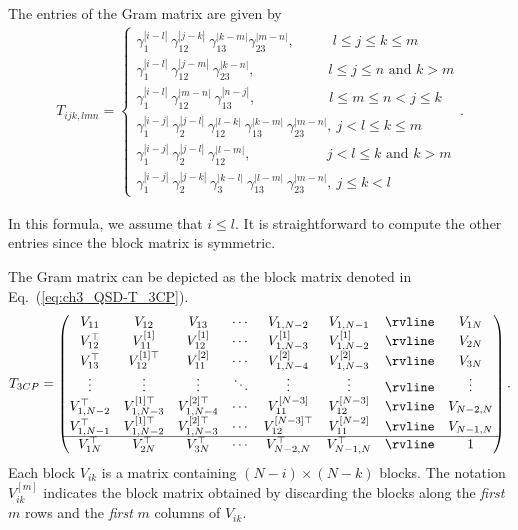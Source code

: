 \begin{appendices}
The entries of the Gram matrix are given by
\begin{align}
    T_{ijk,lmn} =
    \begin{cases}
        \gamma_1^{|i-l|}\ \gamma_{12}^{|j-k|}\ \gamma_{13}^{|k-m|} \gamma_{23}^{|m-n|},\ \hspace{30pt} l \le j \le k \le m \\
        \gamma_1^{|i-l|}\ \gamma_{12}^{|j-m|}\ \gamma_{23}^{|k-n|},\ \hspace{60pt} l \le j \le n \text{ and } k > m \\
        \gamma_1^{|i-l|}\ \gamma_{12}^{|m-n|}\ \gamma_{13}^{|n-j|},\ \hspace{60pt} l \le m \le n < j \le k \\
        \gamma_1^{|i-j|}\ \gamma_2^{|j-l|}\ \gamma_{12}^{|l-k|}\ \gamma_{13}^{|k-m|}\ \gamma_{23}^{|m-n|},\ j < l \le k \le m \\
        \gamma_1^{|i-j|}\ \gamma_2^{|j-l|}\ \gamma_{12}^{|l-m|},\ \hspace{62pt} j < l \le k \text{ and } k > m \\
        \gamma_1^{|i-j|}\ \gamma_2^{|j-k|}\ \gamma_3^{|k-l|}\ \gamma_{13}^{|l-m|}\ \gamma_{23}^{|m-n|},\ j \le k < l
    \end{cases}. 
\end{align}

In this formula, we assume that $i \le l$.
It is straightforward to compute the other entries since the block matrix is symmetric.

The Gram matrix can be depicted as the block matrix denoted in Eq.~(\ref{eq:ch3_QSD-T_3CP}).
\begin{align}
    \label{eq:ch3_QSD-T_3CP}
    T_{3CP} =
    \begin{pmatrix}
        V_{11} & V_{12} & V_{13} & \cdots & V_{1,N-2} & V_{1,N-1} & \rvline & V_{1N} \\
        V_{12}^\top & V_{11}^{[1]} & V_{12}^{[1]} & \cdots & V_{1,N-3}^{[1]} & V_{1,N-2}^{[1]} & \rvline & V_{2N} \\
        V_{13}^\top & V_{12}^{[1]\top} & V_{11}^{[2]} & \cdots & V_{1,N-4}^{[2]} & V_{1, N-3}^{[2]} & \rvline & V_{3N} \\
        \vdots & \vdots & \vdots & \ddots & \vdots & \vdots & \rvline & \vdots \\
        V_{1,N-2}^\top & V_{1,N-3}^{[1]\top} & V_{1,N-4}^{[2]\top} & \cdots & V_{11}^{[N-3]} & V_{12}^{[N-3]} & \rvline & V_{N-2,N} \\
        V_{1,N-1}^\top & V_{1,N-2}^{[1]\top} & V_{1,N-3}^{[2]\top} & \cdots & V_{12}^{[N-3]\top} & V_{11}^{[N-2]} & \rvline & V_{N-1,N} \\
        \hline
        V_{1N}^\top & V_{2N}^\top & V_{3N}^\top & \cdots & V_{N-2,N}^\top & V_{N-1,N}^\top & \rvline & 1 \\
    \end{pmatrix}. 
\end{align}
Each block $V_{ik}$ is a matrix containing $(N-i) \times (N-k)$ blocks.
The notation $V_{ik}^{[m]}$ indicates the block matrix obtained by discarding the blocks along the \emph{first} $m$ rows and the \emph{first} $m$ columns of $V_{ik}$.


\end{appendices}
